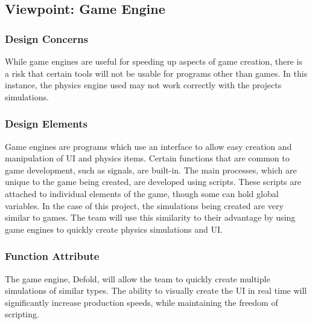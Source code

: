 \documentclass[onecolumn, draftclsnofoot,10pt, compsoc]{IEEEtran}
\begin{document}
\subsection{Viewpoint: Game Engine}

\subsubsection{Design Concerns}
While game engines are useful for speeding up aspects of game creation, there is a risk that certain tools will not be usable for programs other than games. In this instance, the physics engine used may not work correctly with the projects simulations.

\subsubsection{Design Elements}
Game engines are programs which use an interface to allow easy creation and manipulation of UI and physics items. Certain functions that are common to game development, such as signals, are built-in. The main processes, which are unique to the game being created, are developed using scripts. These scripts are attached to individual elements of the game, though some can hold global variables. In the case of this project, the simulations being created are very similar to games. The team will use this similarity to their advantage by using game engines to quickly create physics simulations and UI.


\subsubsection{Function Attribute}
The game engine, Defold, will allow the team to quickly create multiple simulations of similar types. The ability to visually create the UI in real time will significantly increase production speeds, while maintaining the freedom of scripting.
\newline
\end{document}
